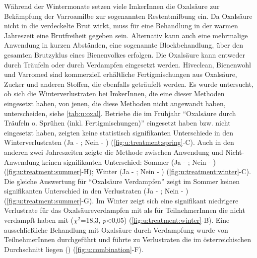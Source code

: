 Während der Wintermonate setzen viele ImkerInnen die Oxalsäure zur Bekämpfung der Varroamilbe zur sogenannten Restentmilbung ein. Da Oxalsäure nicht in die verdeckelte Brut wirkt, muss für eine Behandlung in der warmen Jahreszeit eine Brutfreiheit gegeben sein. Alternativ kann auch eine mehrmalige Anwendung in kurzen Abständen, eine sogenannte Blockbehandlung, über den gesamten Brutzyklus eines Bienenvolkes erfolgen. 
\newline
Die Oxalsäure kann entweder durch Träufeln oder durch Verdampfen eingesetzt werden. Hiveclean, Bienenwohl und Varromed sind
kommerziell erhältliche Fertigmischungen aus Oxalsäure, Zucker und anderen Stoffen, die ebenfalls geträufelt werden. Es wurde untersucht, ob sich die Winterverlustraten bei ImkerInnen, die eine dieser Methoden eingesetzt haben, von jenen, die diese Methoden nicht angewandt haben, unterscheiden, siehe \cref{tab:u:oxal}.
\newline
Betriebe die im Frühjahr \enquote{Oxalsäure durch Träufeln o. Sprühen (inkl. Fertigmischungen)} eingesetzt haben bzw. nicht eingesetzt haben, zeigten keine statistisch signifikanten Unterschiede in den Winterverlustraten (Ja - ; Nein - ) (\cref{fig:u:treatment:spring}-C). Auch in den anderen zwei Jahreszeiten zeigte die Methode zwischen Anwendung und Nicht-Anwendung keinen signifikanten Unterschied: Sommer (Ja - ; Nein - ) (\cref{fig:u:treatment:summer}-H); Winter (Ja - ; Nein - ) (\cref{fig:u:treatment:winter}-C).
\newline
Die gleiche Auswertung für \enquote{Oxalsäure Verdampfen} zeigt im Sommer keinen signifikanten Unterschied in den Verlustraten (Ja - ; Nein - ) (\cref{fig:u:treatment:summer}-G). Im Winter zeigt sich eine signifikant niedrigere Verlustrate für das Oxalsäureverdampfen mit  als für TeilnehmerInnen die nicht verdampft haben mit  ($\chi^{2}$=18,3, \textit{p}<0,05) (\cref{fig:u:treatment:winter}-B). Eine ausschließliche Behandlung mit Oxalsäure durch Verdampfung wurde von  TeilnehmerInnen durchgeführt und führte zu Verlustraten die im österreichischen Durchschnitt liegen () (\cref{fig:u:combination}-F).



\label{sss:mischungox:u}


